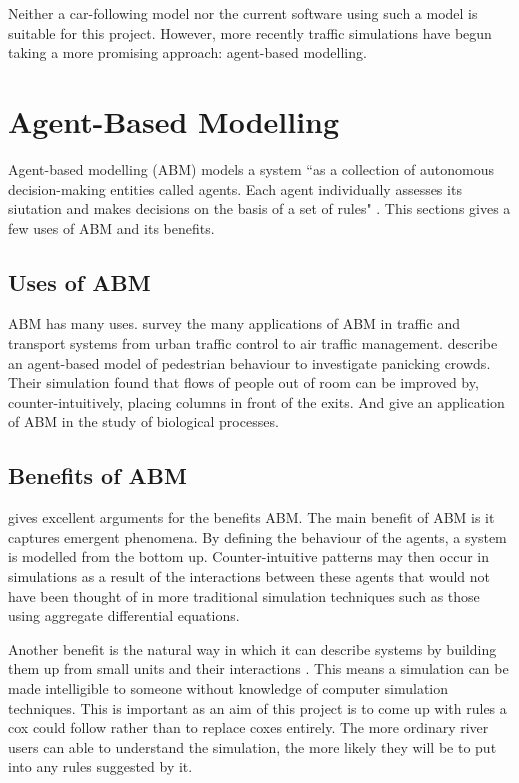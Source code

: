     Neither a car-following model nor the current software using such a model is suitable for this project. However, more recently traffic simulations have begun taking a more promising approach: agent-based modelling.
      
    \section{Agent-Based Modelling}
    Agent-based modelling (ABM) models a system ``as a collection of autonomous decision-making entities called agents. Each agent individually assesses its siutation and makes decisions on the basis of a set of rules" \cite{Bonabeau2002}. This sections gives a few uses of ABM and its benefits.
    
    \subsection{Uses of ABM}
    ABM has many uses. \textcite{Chen2010} survey the many applications of ABM in traffic and transport systems from urban traffic control to air traffic management. \textcite{Helbing2000} describe an agent-based model of pedestrian behaviour to investigate panicking crowds. Their simulation found that flows of people out of room can be improved by, counter-intuitively, placing columns in front of the exits. And \textcite{Miller2010} give an application of ABM in the study of biological processes.
    
    \subsection{Benefits of ABM}
      \textcite{Bonabeau2002} gives excellent arguments for the benefits ABM. The main benefit of ABM is it captures emergent phenomena. By defining the behaviour of the agents, a system is modelled from the bottom up. Counter-intuitive patterns may then occur in simulations as a result of the interactions between these agents that would not have been thought of in more traditional simulation techniques such as those using aggregate differential equations.
      
      Another benefit is the natural way in which it can describe systems by building them up from small units and their interactions \cite{Bonabeau2002}. This means a simulation can be made intelligible to someone without knowledge of computer simulation techniques. This is important as an aim of this project is to come up with rules a cox could follow rather than to replace coxes entirely. The more ordinary river users can able to understand the simulation, the more likely they will be to put into any rules suggested by it.
    
